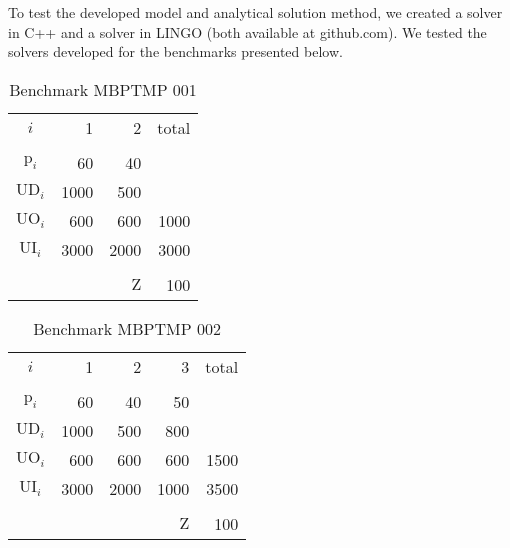\documentclass[preprint,12pt,authoryear]{elsarticle}
\begin{document}
To test the developed model and analytical solution method, we created a solver in C++ and a solver in LINGO (both available at github.com). We tested the solvers developed for the benchmarks presented below. 

\begin{table}[h]
\begin{center}
\begin{tabular}[c]{c r r r}
$i$ & 1 & 2 & total \\
\cline {1-4} \\
$\textrm{p}_i$ & 60 & 40 & \\
$\textrm{UD}_i$ & 1000 & 500 & \\
$\textrm{UO}_i$ & 600 & 600 & 1000 \\
$\textrm{UI}_i$ & 3000 & 2000 & 3000 \\
\cline {1-4} \\
& & $\textrm{Z}$ & 100 \\
\end{tabular}
\label{tab:MBPTMP 001}
\caption{Benchmark MBPTMP 001}
\end{center}
\end{table}

\begin{table}[h]
\begin{center}
\begin{tabular}[c]{c r r r r}
$i$ & 1 & 2 & 3 & total \\
\cline {1-5} \\
$\textrm{p}_i$ & 60 & 40 & 50 \\
$\textrm{UD}_i$ & 1000 & 500 & 800 \\
$\textrm{UO}_i$ & 600 & 600 & 600 & 1500 \\
$\textrm{UI}_i$ & 3000 & 2000 & 1000 & 3500 \\
\cline {1-5} \\
& & & $\textrm{Z}$ & 100 \\
\end{tabular}
\label{tab:MBPTMP 001}
\caption{Benchmark MBPTMP 002}
\end{center}
\end{table}
\end{document}
